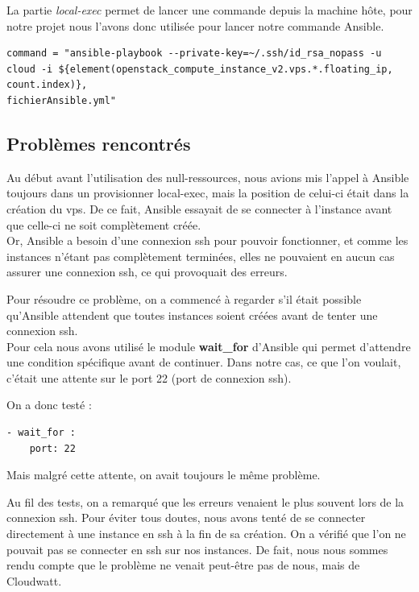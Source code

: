 \documentclass[]{article}
\begin{document}
La partie \textit{local-exec} permet de lancer une commande depuis la machine hôte, pour notre projet nous l'avons donc utilisée pour lancer notre commande Ansible.
\begin{verbatim}
command = "ansible-playbook --private-key=~/.ssh/id_rsa_nopass -u 
cloud -i ${element(openstack_compute_instance_v2.vps.*.floating_ip, count.index)},
fichierAnsible.yml"
\end{verbatim}


\subsection{Problèmes rencontrés}\label{probluxe8me-que-lon-a-eu}

Au début avant l'utilisation des null-ressources, nous avions mis l'appel à Ansible toujours dans un provisionner local-exec, mais la position de celui-ci était dans la création du vps. De ce fait, Ansible essayait de se connecter à l'instance avant que celle-ci ne soit complètement créée. \\ Or, Ansible a besoin d'une connexion ssh pour pouvoir fonctionner, et comme les instances
n'étant pas complètement terminées, elles ne pouvaient en aucun cas
assurer une connexion ssh, ce qui provoquait des erreurs.

Pour résoudre ce problème, on a commencé à regarder s'il était possible
qu'Ansible attendent que toutes instances soient créées avant de tenter
une connexion ssh.\\
 Pour cela nous avons utilisé le module
\textbf{wait\_for} d'Ansible qui permet d'attendre une condition
spécifique avant de continuer. Dans notre cas, ce que l'on voulait,
c'était une attente sur le port 22 (port de connexion ssh).

On a donc testé :

\begin{verbatim}
- wait_for :
    port: 22
\end{verbatim}

Mais malgré cette attente, on avait toujours le même problème.

Au fil des tests, on a remarqué que les erreurs venaient le plus souvent
lors de la connexion ssh. Pour éviter tous doutes, nous avons tenté de se
connecter directement à une instance en ssh à  la fin de sa création.
On a vérifié que l'on ne pouvait pas se connecter en
ssh sur nos instances. De fait, nous nous sommes rendu compte que le problème ne
venait peut-être pas de nous, mais de Cloudwatt. 
\end{document}
